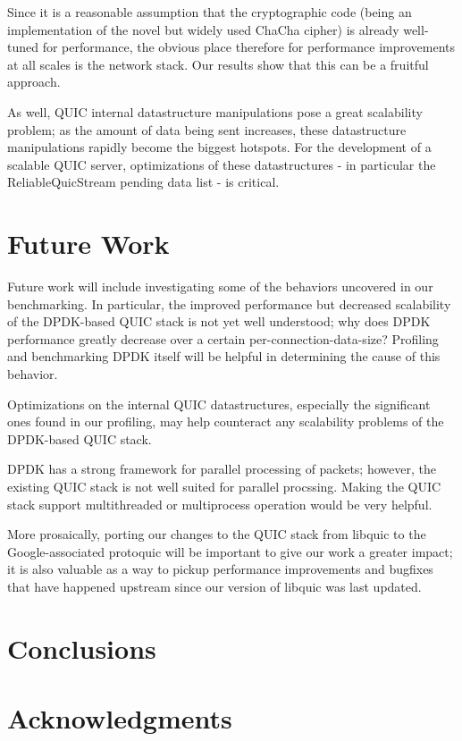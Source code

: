 \documentclass{sig-alternate-05-2015}
\begin{document}
Since it is a reasonable assumption that the cryptographic code
(being an implementation of the novel but widely used ChaCha cipher)
is already well-tuned for performance,
the obvious place therefore for performance improvements at all scales
is the network stack.
Our results show that this can be a fruitful approach.

As well, QUIC internal datastructure manipulations pose a great scalability problem;
as the amount of data being sent increases,
these datastructure manipulations rapidly become the biggest hotspots.
For the development of a scalable QUIC server, optimizations of these datastructures
- in particular the ReliableQuicStream pending data list -
is critical.

\section{Future Work}

Future work will include investigating some of the behaviors uncovered in our benchmarking.
In particular, the improved performance but decreased scalability of the DPDK-based QUIC stack
is not yet well understood;
why does DPDK performance greatly decrease over a certain per-connection-data-size?
Profiling and benchmarking DPDK itself will be helpful in determining the cause of this behavior.

Optimizations on the internal QUIC datastructures,
especially the significant ones found in our profiling,
may help counteract any scalability problems of the DPDK-based QUIC stack.

DPDK has a strong framework for parallel processing of packets;
however, the existing QUIC stack is not well suited for parallel procssing.
Making the QUIC stack support multithreaded or multiprocess operation would be very helpful.

More prosaically, porting our changes to the QUIC stack from libquic
to the Google-associated protoquic
will be important to give our work a greater impact;
it is also valuable as a way to pickup performance improvements and bugfixes that have happened upstream
since our version of libquic was last updated.

\section{Conclusions}


\section{Acknowledgments}





\end{document}
